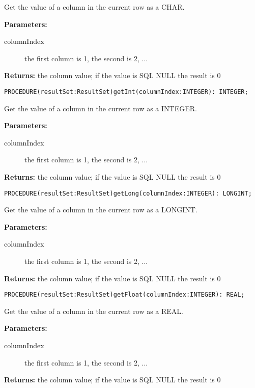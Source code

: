      Get the value of a column in the current row as a CHAR. 

     {\bf Parameters: } 
\begin{description}
\item[columnIndex] the first column is 1, the second is 2, ... 
\end{description}
     {\bf Returns: } 
          the column value; if the value is SQL NULL the result is 0 


\verb'PROCEDURE(resultSet:ResultSet)getInt(columnIndex:INTEGER): INTEGER;'

     Get the value of a column in the current row as a INTEGER. 

     {\bf Parameters: } 
\begin{description}
\item[columnIndex] the first column is 1, the second is 2, ... 
\end{description}

     {\bf Returns: } 
          the column value; if the value is SQL NULL the result is 0 


\verb'PROCEDURE(resultSet:ResultSet)getLong(columnIndex:INTEGER): LONGINT;'

     Get the value of a column in the current row as a LONGINT. 

     {\bf Parameters: } 
\begin{description}
\item[columnIndex] the first column is 1, the second is 2, ... 
\end{description}

     {\bf Returns: } 
          the column value; if the value is SQL NULL the result is 0 


\verb'PROCEDURE(resultSet:ResultSet)getFloat(columnIndex:INTEGER): REAL;'

     Get the value of a column in the current row as a REAL. 

     {\bf Parameters: } 
\begin{description}
\item[columnIndex] the first column is 1, the second is 2, ... 
\end{description}

     {\bf Returns: } 
          the column value; if the value is SQL NULL the result is 0 


